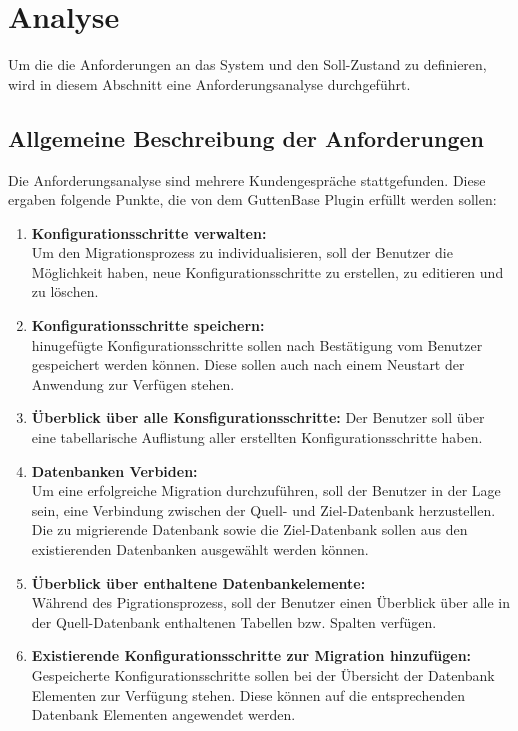 \section{Analyse}
Um die die Anforderungen an das System und den Soll-Zustand zu definieren, wird in diesem Abschnitt eine Anforderungsanalyse durchgeführt. 


\subsection{Allgemeine Beschreibung der Anforderungen}
Die Anforderungsanalyse sind mehrere Kundengespräche stattgefunden. Diese ergaben folgende Punkte, die von dem GuttenBase Plugin erfüllt werden sollen:
\begin{enumerate}
	\item \textbf{Konfigurationsschritte verwalten:}\\
	Um den Migrationsprozess zu individualisieren, soll der Benutzer die Möglichkeit haben, neue Konfigurationsschritte zu erstellen, zu editieren und zu löschen.
	\item \textbf{Konfigurationsschritte speichern:} \\
	hinugefügte Konfigurationsschritte sollen nach Bestätigung vom Benutzer gespeichert werden können. Diese sollen auch nach einem Neustart der Anwendung zur Verfügen stehen.
	\item \textbf{Überblick über alle Konsfigurationsschritte:}
	Der Benutzer soll über eine tabellarische Auflistung aller erstellten Konfigurationsschritte haben.
	\item \textbf{Datenbanken Verbiden:} \\
	Um eine erfolgreiche Migration durchzuführen, soll der Benutzer in der Lage sein, eine Verbindung zwischen der Quell- und Ziel-Datenbank herzustellen. Die zu migrierende Datenbank sowie die Ziel-Datenbank sollen aus den existierenden Datenbanken ausgewählt werden können.
	\item \textbf{Überblick über enthaltene Datenbankelemente:}\\
	Während des Pigrationsprozess, soll der Benutzer einen Überblick über alle in der Quell-Datenbank enthaltenen Tabellen bzw. Spalten verfügen.
	\item \textbf{Existierende Konfigurationsschritte zur Migration hinzufügen:}\\
	Gespeicherte Konfigurationsschritte sollen bei der Übersicht der Datenbank Elementen zur Verfügung stehen. Diese können auf die entsprechenden Datenbank Elementen angewendet werden.

\end{enumerate}
